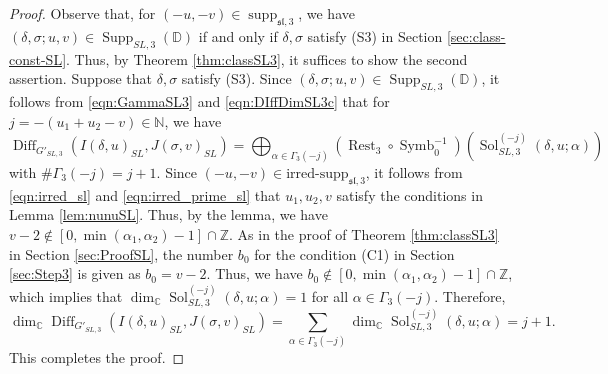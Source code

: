 \documentclass[a4paper,11pt,reqno]{amsart}
\newcommand{\DD}{\mathbb{D}}
\newcommand{\0}{{\bf 0}}
\newcommand{\N}{\mathbb{N}}
\newcommand{\Z}{\mathbb{Z}}
\newcommand{\C}{\mathbb{C}}
\newcommand{\1}{{\bf 1}}
\newcommand{\irredsupp}{\mathrm{irred\text{-}supp}}
\DeclareMathOperator{\supp}{supp}
\DeclareMathOperator{\Supp}{Supp}
\DeclareMathOperator{\Diff}{Diff}
\DeclareMathOperator{\Sol}{Sol}
\newcommand{\fraksl}{{\mathfrak{sl}}}
\DeclareMathOperator{\Symb}{Symb}
\DeclareMathOperator{\Rest}{Rest}
\theoremstyle{plain}
\theoremstyle{definition}
\numberwithin{equation}{section}
\theoremstyle{definition}
\begin{document}
\begin{proof}
Observe that, for $(-u,-v) \in \supp_{\fraksl,3}$, we have 
$(\delta, \sigma;u,v) \in \Supp_{SL,3}(\DD)$ if and only if 
$\delta, \sigma$ satisfy (S3) in Section \ref{sec:class-const-SL}.
Thus, by Theorem \ref{thm:classSL3}, it suffices to show the second assertion. 
Suppose that $\delta, \sigma$ satisfy (S3).
Since $(\delta, \sigma;u,v) \in \Supp_{SL,3}(\DD)$,
it follows from \eqref{eqn:GammaSL3} and 
\eqref{eqn:DIffDimSL3c} that
for $j=-(u_1+u_2-v)\in\N$, we have 
\begin{equation*}
\Diff_{G'_{SL,3}}(I(\delta,u)_{SL}, J(\sigma,v)_{SL})
=\bigoplus_{\alpha\in\Gamma_3(-j)}
(\Rest_3 \circ \Symb_0^{-1})(\Sol_{SL,3}^{(-j)}(\delta, u;\alpha))
\end{equation*}
with $\# \Gamma_3(-j) = j+1$. Since $(-u, -v) \in \irredsupp_{\fraksl,3}$,
it follows from \eqref{eqn:irred_sl} and \eqref{eqn:irred_prime_sl} that
$u_1, u_2, v$ satisfy the conditions in Lemma \ref{lem:nunuSL}.
Thus, by the lemma, we have $v-2 \notin [0,\min(\alpha_1,\alpha_2)-1]\cap \Z$.
As in the proof of Theorem \ref{thm:classSL3} in Section \ref{sec:ProofSL}, 
the number $b_0$ for 
the condition (C1) in Section \ref{sec:Step3} is given as $b_0=v-2$.
Thus, we have $b_0 \notin  [0, \min(\alpha_1,\alpha_2)-1]\cap \Z$,
which implies that 
$\dim_\C\Sol_{SL,3}^{(-j)}(\delta, u;\alpha)= 1$ for all $\alpha \in \Gamma_3(-j)$.
Therefore,
\begin{equation*}
\dim_\C \Diff_{G'_{SL,3}}(I(\delta,u)_{SL}, J(\sigma,v)_{SL})
=\sum_{\alpha \in \Gamma_3(-j)} \dim_\C\Sol_{SL,3}^{(-j)}(\delta, u;\alpha) = j+1.
\end{equation*}
This completes the proof.
\end{proof}
\end{document}
